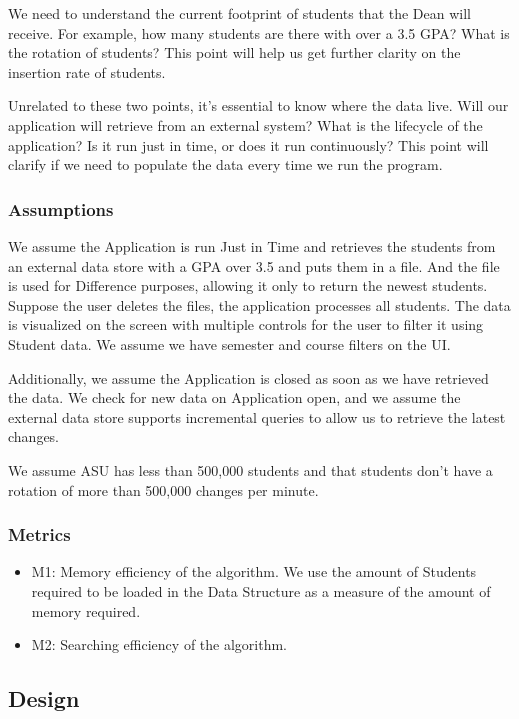 \documentclass{article}
\begin{document}
We need to understand the current footprint of students that the Dean will receive. For example, how many students are there with over a 3.5 GPA? What is the rotation of students? This point will help us get further clarity on the insertion rate of students. 

Unrelated to these two points, it's essential to know where the data live. Will our application will retrieve from an external system? What is the lifecycle of the application? Is it run just in time, or does it run continuously? This point will clarify if we need to populate the data every time we run the program.

\subsubsection{Assumptions}

We assume the Application is run Just in Time and retrieves the students from an external data store with a GPA over 3.5 and puts them in a file. And the file is used for Difference purposes, allowing it only to return the newest students. Suppose the user deletes the files, the application processes all students. The data is visualized on the screen with multiple controls for the user to filter it using Student data. We assume we have semester and course filters on the UI. 

Additionally, we assume the Application is closed as soon as we have retrieved the data. We check for new data on Application open, and we assume the external data store supports incremental queries to allow us to retrieve the latest changes. 

We assume ASU has less than 500,000 students and that students don't have a rotation of more than 500,000 changes per minute.

\subsubsection{Metrics}

\begin{itemize}
  \item M1: Memory efficiency of the algorithm. We use the amount of Students required to be loaded in the Data Structure as a measure of the amount of memory required. 
  \item M2: Searching efficiency of the algorithm.
\end{itemize}

\subsection{Design}
\end{document}
